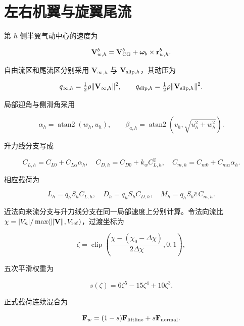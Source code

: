 \documentclass[UTF8,12pt,oneside,openany,fontset=windows]{ctexbook}
\begin{document}
\section{左右机翼与旋翼尾流}

第 \(h\) 侧半翼气动中心的速度为

\begin{equation}
\mathbf V_{w,h}^b=\mathbf V_{\rm CG}^b+\boldsymbol\omega_b\times\mathbf r_{w,h}^b .
\end{equation}

自由流区和尾流区分别采用 \(\mathbf V_{\infty,h}\) 与 \(\mathbf V_{{\rm slip},h}\)，其动压为

\begin{equation}
q_{\infty,h}=\tfrac12\rho\|\mathbf V_{\infty,h}\|^2,\qquad
q_{{\rm slip},h}=\tfrac12\rho\|\mathbf V_{{\rm slip},h}\|^2.
\end{equation}

局部迎角与侧滑角采用

\begin{equation}
\alpha_h=\operatorname{atan2}(w_h,u_h),\qquad
\beta_{a,h}=\operatorname{atan2}(v_h,\sqrt{u_h^2+w_h^2}).
\end{equation}

升力线分支写成

\begin{equation}
C_{L,h}=C_{L0}+C_{L\alpha}\alpha_h,\quad
C_{D,h}=C_{D0}+k_wC_{L,h}^2,\quad
C_{m,h}=C_{m0}+C_{m\alpha}\alpha_h .
\end{equation}

相应载荷为

\begin{equation}
L_h=q_hS_hC_{L,h},\quad D_h=q_hS_hC_{D,h},\quad
M_h=q_hS_h\bar c\,C_{m,h}.
\end{equation}

近法向来流分支与升力线分支在同一局部速度上分别计算。令法向流比 \(\chi=|V_n|/\max(\|\mathbf V\|,V_{\rm ref})\)，过渡坐标为

\begin{equation}
\zeta=\operatorname{clip}\left(\frac{\chi-(\chi_0-\Delta\chi)}
{2\Delta\chi},0,1\right),
\end{equation}

五次平滑权重为

\begin{equation}
s(\zeta)=6\zeta^5-15\zeta^4+10\zeta^3.
\end{equation}

正式载荷连续混合为

\begin{equation}
\mathbf F_w=(1-s)\mathbf F_{\rm liftline}+s\mathbf F_{\rm normal}.
\end{equation}
\end{document}
